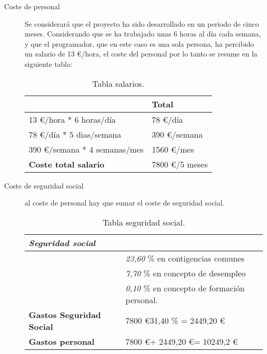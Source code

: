 \begin{description}
	\item[Coste de personal] Se considerará que el proyecto ha sido desarrollado en un periodo de cinco meses.  Considerando que se ha trabajado unas 6 horas al día cada semana, y que el programador, que en este caso es una sola persona, ha percibido un salario de 13 \euro /hora, el coste del personal por lo tanto se resume en la siguiente tabla:
	
\begin{table}[htbp]
\begin{center}
\begin{tabular}{|l|l|}
\hline
 & Total \\
\hline \hline
13 \euro /hora * 6 horas/día &   78 \euro /día \\ \hline
78 \euro /día * 5 dias/semana &   390 \euro /semana \\ \hline
390 \euro /semana * 4 semanas/mes &   1560 \euro /mes \\ \hline
\textbf{Coste total salario} &   7800 \euro /5 meses \\ \hline
\end{tabular}
\caption{Tabla salarios.}
\label{tabla:salarios}
\end{center}
\end{table}
	
	\item[Coste de seguridad social] al coste de personal hay que sumar el coste de seguridad social. 
	
	
	\begin{table}[htbp]
\begin{center}
\begin{tabular}{|l|l|}
\hline
 \emph{Seguridad social} &  \\
\hline \hline
 & \emph{23,60} \% en contigencias comunes \\ \hline
&   \emph{7,70} \% en concepto de desempleo \\ \hline
 &   \emph{0,10} \% en concepto de formación personal. \\ \hline
\textbf{Gastos Seguridad Social}  &   7800 \euro  * 31,40 \% =  2449,20 \euro \\ \hline
\textbf{Gastos personal}  &  7800 \euro  + 2449,20 \euro  = 10249,2 \euro  \\ \hline
\end{tabular}
\caption{Tabla seguridad social.}
\label{tabla:ssocial}
\end{center}
\end{table}
	

\end{description}
